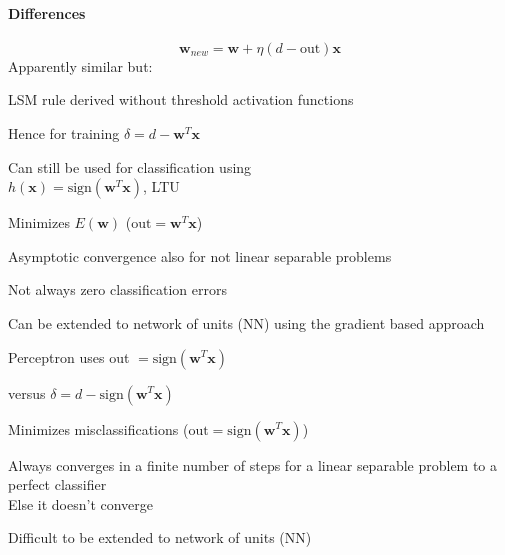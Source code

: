 \documentclass[10pt]{report}
\begin{document}
\paragraph{Differences}
	$$\mathbf{w}_{new} = \mathbf{w} + \eta(d-\text{out})\mathbf{x}$$
Apparently similar but:
\begin{multicols}{2}
	\begin{list}{}{\textbf{LMS algorithm}}
		\item LSM rule derived without threshold activation functions
		\item Hence for training $\delta = d - \mathbf{w}^T\mathbf{x}$
		\item Can still be used for classification using\\$h(\mathbf{x}) = \text{sign}(\mathbf{w}^T \mathbf{x})$, LTU
		\item Minimizes $E(\mathbf{w})$ ($\text{out} = \mathbf{w}^T\mathbf{x}$)
		\item Asymptotic convergence also for not linear separable problems
		\item Not always zero classification errors
		\item Can be extended to network of units (NN) using the gradient based approach
	\end{list}
	\begin{list}{}{\textbf{Perceptron learning algorithm}}
		\item Perceptron uses out $= \text{sign}(\mathbf{w}^T\mathbf{x})$
		\item versus $\delta = d - \text{sign}(\mathbf{w}^T\mathbf{x})$
		\item
		\item Minimizes misclassifications ($\text{out} = \text{sign}(\mathbf{w}^T\mathbf{x})$)
		\item Always converges in a finite number of steps for a linear separable problem to a perfect classifier\\
		Else it doesn't converge
		\item 
		\item Difficult to be extended to network of units (NN)
	\end{list}
\end{multicols}
\end{document}
